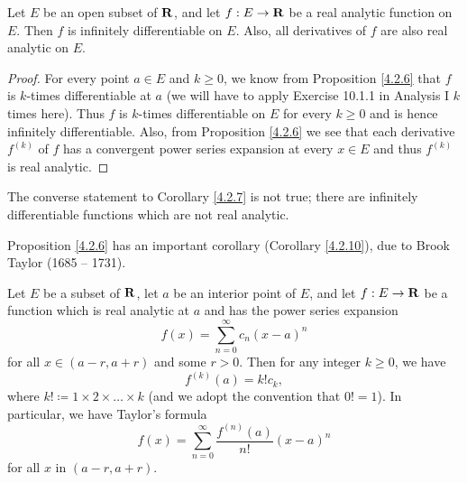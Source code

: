 \begin{corollary}\label{4.2.7}
    Let \(E\) be an open subset of \(\mathbf{R}\), and let \(f : E \to \mathbf{R}\) be a real analytic function on \(E\).
    Then \(f\) is infinitely differentiable on \(E\).
    Also, all derivatives of \(f\) are also real analytic on \(E\).
\end{corollary}

\begin{proof}
    For every point \(a \in E\) and \(k \geq 0\), we know from Proposition \ref{4.2.6} that \(f\) is \(k\)-times differentiable at \(a\)
    (we will have to apply Exercise 10.1.1 in Analysis I \(k\) times here).
    Thus \(f\) is \(k\)-times differentiable on \(E\) for every \(k \geq 0\) and is hence infinitely differentiable.
    Also, from Proposition \ref{4.2.6} we see that each derivative \(f^{(k)}\) of \(f\) has a convergent power series expansion at every \(x \in E\) and thus \(f^{(k)}\) is real analytic.
\end{proof}

\setcounter{theorem}{8}
\begin{remark}\label{4.2.9}
    The converse statement to Corollary \ref{4.2.7} is not true;
    there are infinitely differentiable functions which are not real analytic.
\end{remark}

\begin{note}
    Proposition \ref{4.2.6} has an important corollary (Corollary \ref{4.2.10}), due to Brook Taylor (1685 -- 1731).
\end{note}

\begin{corollary}\label{4.2.10}
    Let \(E\) be a subset of \(\mathbf{R}\), let \(a\) be an interior point of \(E\), and let \(f : E \to \mathbf{R}\) be a function which is real analytic at \(a\) and has the power series expansion
    \[
        f(x) = \sum_{n = 0}^\infty c_n (x - a)^n
    \]
    for all \(x \in (a - r, a + r)\) and some \(r > 0\).
    Then for any integer \(k \geq 0\), we have
    \[
        f^{(k)}(a) = k! c_k,
    \]
    where \(k! \coloneqq 1 \times 2 \times \dots \times k\)
    (and we adopt the convention that \(0! = 1\)).
    In particular, we have Taylor's formula
    \[
        f(x) = \sum_{n = 0}^\infty \frac{f^{(n)}(a)}{n!} (x - a)^n
    \]
    for all \(x\) in \((a - r, a + r)\).
\end{corollary}

